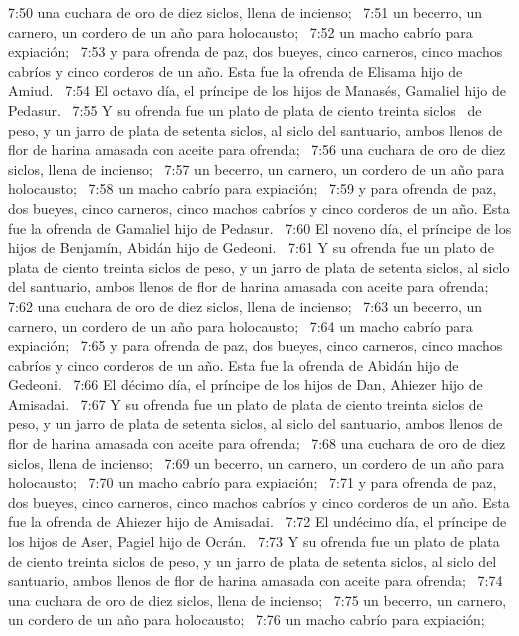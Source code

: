 7:50 una cuchara de oro de diez siclos, llena de incienso;  
7:51 un becerro, un carnero, un cordero de un año para holocausto;  
7:52 un macho cabrío para expiación;  
7:53 y para ofrenda de paz, dos bueyes, cinco carneros, cinco machos cabríos y cinco corderos de un año. Esta fue la ofrenda de Elisama hijo de Amiud.  
7:54 El octavo día, el príncipe de los hijos de Manasés, Gamaliel hijo de Pedasur.  
7:55 Y su ofrenda fue un plato de plata de ciento treinta siclos  de peso, y un jarro de plata de setenta siclos, al siclo del santuario, ambos llenos de flor de harina amasada con aceite para ofrenda;  
7:56 una cuchara de oro de diez siclos, llena de incienso;  
7:57 un becerro, un carnero, un cordero de un año para holocausto;  
7:58 un macho cabrío para expiación;  
7:59 y para ofrenda de paz, dos bueyes, cinco carneros, cinco machos cabríos y cinco corderos de un año. Esta fue la ofrenda de Gamaliel hijo de Pedasur.  
7:60 El noveno día, el príncipe de los hijos de Benjamín, Abidán hijo de Gedeoni.  
7:61 Y su ofrenda fue un plato de plata de ciento treinta siclos de peso, y un jarro de plata de setenta siclos, al siclo del santuario, ambos llenos de flor de harina amasada con aceite para ofrenda;  
7:62 una cuchara de oro de diez siclos, llena de incienso;  
7:63 un becerro, un carnero, un cordero de un año para holocausto;  
7:64 un macho cabrío para expiación;  
7:65 y para ofrenda de paz, dos bueyes, cinco carneros, cinco machos cabríos y cinco corderos de un año. Esta fue la ofrenda de Abidán hijo de Gedeoni.  
7:66 El décimo día, el príncipe de los hijos de Dan, Ahiezer hijo de Amisadai.  
7:67 Y su ofrenda fue un plato de plata de ciento treinta siclos de peso, y un jarro de plata de setenta siclos, al siclo del santuario, ambos llenos de flor de harina amasada con aceite para ofrenda;  
7:68 una cuchara de oro de diez siclos, llena de incienso;  
7:69 un becerro, un carnero, un cordero de un año para holocausto;  
7:70 un macho cabrío para expiación;  
7:71 y para ofrenda de paz, dos bueyes, cinco carneros, cinco machos cabríos y cinco corderos de un año. Esta fue la ofrenda de Ahiezer hijo de Amisadai.  
7:72 El undécimo día, el príncipe de los hijos de Aser, Pagiel hijo de Ocrán.  
7:73 Y su ofrenda fue un plato de plata de ciento treinta siclos de peso, y un jarro de plata de setenta siclos, al siclo del santuario, ambos llenos de flor de harina amasada con aceite para ofrenda;  
7:74 una cuchara de oro de diez siclos, llena de incienso;  
7:75 un becerro, un carnero, un cordero de un año para holocausto;  
7:76 un macho cabrío para expiación;  
